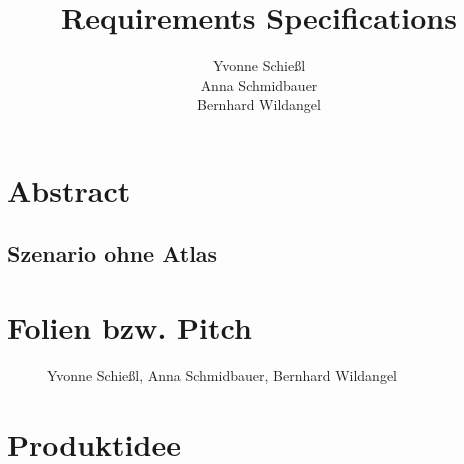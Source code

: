 \documentclass[a4paper, 12pp]{article}
\title{\textbf{Requirements Specifications}}
\author{ Yvonne Schießl \\
		Anna Schmidbauer\\
		Bernhard Wildangel}
\date{}
\begin{document}
\maketitle
\tableofcontents
\newpage
\section{Abstract}
\subsection{Szenario ohne Atlas}

\section{Folien bzw. Pitch}

\begin{figure}[H] 
\centering
	\fbox{\begin{minipage}{13cm} 
	\end{minipage}}

	\vspace{0.3cm}

	\fbox{\begin{minipage}{13cm}  
	\end{minipage}}

	\vspace{0.3cm}

	\fbox{\begin{minipage}{13cm} 
	\end{minipage}}
	
Yvonne Schießl, Anna Schmidbauer, Bernhard Wildangel
	
\end{figure}

\section{Produktidee}
\end{document}
